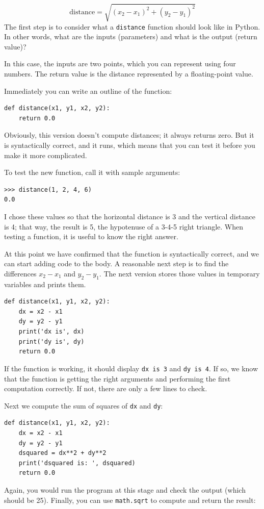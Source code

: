 \documentclass[10pt]{book}
\begin{document}
\begin{displaymath}
\mathrm{distance} = \sqrt{(x_2 - x_1)^2 + (y_2 - y_1)^2}
\end{displaymath}
%
The first step is to consider what a {\tt distance} function should
look like in Python.  In other words, what are the inputs (parameters)
and what is the output (return value)?

In this case, the inputs are two points, which you can represent
using four numbers.  The return value is the distance represented by
a floating-point value.

Immediately you can write an outline of the function:

\begin{verbatim}
def distance(x1, y1, x2, y2):
    return 0.0
\end{verbatim}
%
Obviously, this version doesn't compute distances; it always returns
zero.  But it is syntactically correct, and it runs, which means that
you can test it before you make it more complicated.

To test the new function, call it with sample arguments:

\begin{verbatim}
>>> distance(1, 2, 4, 6)
0.0
\end{verbatim}
%
I chose these values so that the horizontal distance is 3 and the
vertical distance is 4; that way, the result is 5, the hypotenuse
of a 3-4-5 right triangle. When testing a function, it is
useful to know the right answer.

At this point we have confirmed that the function is syntactically
correct, and we can start adding code to the body.
A reasonable next step is to find the differences
$x_2 - x_1$ and $y_2 - y_1$.  The next version stores those values in
temporary variables and prints them.

\begin{verbatim}
def distance(x1, y1, x2, y2):
    dx = x2 - x1
    dy = y2 - y1
    print('dx is', dx)
    print('dy is', dy)
    return 0.0
\end{verbatim}
%
If the function is working, it should display \verb"dx is 3" and
\verb"dy is 4".  If so, we know that the function is getting the right
arguments and performing the first computation correctly.  If not,
there are only a few lines to check.

Next we compute the sum of squares of {\tt dx} and {\tt dy}:

\begin{verbatim}
def distance(x1, y1, x2, y2):
    dx = x2 - x1
    dy = y2 - y1
    dsquared = dx**2 + dy**2
    print('dsquared is: ', dsquared)
    return 0.0
\end{verbatim}
%
Again, you would run the program at this stage and check the output
(which should be 25).
Finally, you can use {\tt math.sqrt} to compute and return the result:
\end{document}
